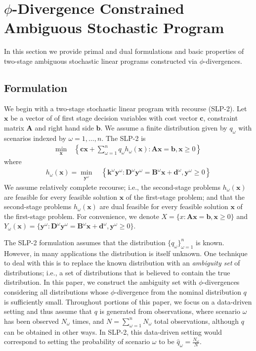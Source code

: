 \documentclass[ijoc,letterpaper]{informs3} %
\newcommand{\x}{\mathbf{x}}
\newcommand{\y}{\mathbf{y}}
\renewcommand{\c}{\mathbf{c}}
\newcommand{\A}{\mathbf{A}}
\renewcommand{\b}{\mathbf{b}}
\renewcommand{\k}{\mathbf{k}}
\newcommand{\D}{\mathbf{D}}
\newcommand{\B}{\mathbf{B}}
\renewcommand{\d}{\mathbf{d}}
\newcommand{\st}{\mbox{s.t.}}
\begin{document}
\section{$\phi$-Divergence Constrained Ambiguous Stochastic Program}
\label{sec:plp2}

In this section we provide primal and dual formulations and basic properties of two-stage ambiguous stochastic linear programs constructed via $\phi$-divergences.

\subsection{Formulation}
\label{ssec:form}

We begin with a two-stage stochastic linear program with recourse (SLP-2).
Let $\x$ be a vector of of first stage decision variables with cost vector $\c$, constraint matrix $\A$ and right hand side $\b$.
We assume a finite distribution given by $q_\omega$ with scenarios indexed by $\omega = 1, \dots, n$.
The SLP-2 is
\begin{align}
	\min_\x \ & \left\{ \c\x + \sum_{\omega=1}^n q_\omega h_\omega(\x) : \A\x = \b, \x \geq 0 \right\} \label{eq:slp_first_stage}%
\end{align}
where
\begin{align}
	h_\omega(\x) = \min_{\y^\omega} \ & \left\{ \k^\omega \y^\omega : \D^\omega \y^\omega = \B^\omega \x + \d^\omega, \y^\omega \geq 0 \right\} \label{eq:slp_second_stage}
\end{align}
We assume relatively complete recourse; i.e., the second-stage problems $h_\omega(\x)$ are feasible for every feasible solution $\x$ of the first-stage problem; and that the second-stage problems $h_\omega(\x)$ are dual feasible for every feasible solution $\x$ of the first-stage problem.
For convenience, we denote $X = \{x : \A\x = \b, \x \geq 0\}$ and $Y_\omega(\x) = \{\y^\omega : \D^\omega \y^\omega = \B^\omega \x + \d^\omega, \y^\omega \geq 0\}$.

The SLP-2 formulation assumes that the distribution $\{q_\omega\}_{\omega=1}^n$ is known.
However, in many applications the distribution is itself unknown.
One technique to deal with this is to replace the known distribution with an {\it ambiguity set} of distributions; i.e., a set of distributions that is believed to contain the true distribution.
In this paper, we construct the ambiguity set with $\phi$-divergences considering all distributions whose $\phi$-divergence from the nominal distribution $q$ is sufficiently small.
Throughout portions of this paper, we focus on a data-driven setting and thus assume that $q$ is generated from observations, where scenario $\omega$ has been observed $N_\omega$ times, and $N = \sum_{\omega=1}^n N_\omega$ total observations, although $q$ can be obtained in other ways.
In SLP-2, this data-driven setting would correspond to setting the probability of scenario $\omega$ to be $\hat{q}_\omega = \frac{N_\omega}{N}$.
\end{document}
